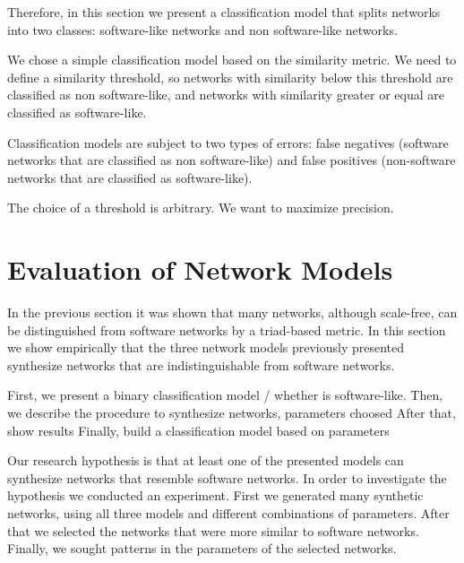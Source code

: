 Therefore, in this section we present a classification
model that splits networks into two classes: software-like networks and non
software-like networks.

We chose a simple classification model based on the similarity metric. We need
to define a similarity threshold, so networks with similarity below this
threshold are classified as non software-like, and networks with similarity
greater or equal are classified as software-like. 

Classification models are subject to two types of errors: false negatives
(software networks that are classified as non software-like) and false positives
(non-software networks that are classified as software-like). 

The choice of a threshold is arbitrary.
We want to maximize precision.


\section{Evaluation of Network Models}

In the previous section it was shown that many networks, although scale-free,
can be distinguished from software networks by a triad-based metric. In this
section we show empirically that the three network models previously presented
synthesize networks that are indistinguishable from software networks.

First, we present a binary classification model / whether is software-like.
Then, we describe the procedure to synthesize networks, parameters choosed
After that, show results
Finally, build a classification model based on parameters




Our research hypothesis is that at least one of the presented models can
synthesize networks that resemble software networks. In order to investigate the
hypothesis we conducted an experiment. First we generated many synthetic
networks, using all three models and different combinations of parameters.
After that we selected the networks that were more similar to software networks.
Finally, we sought patterns in the parameters of the selected networks.

